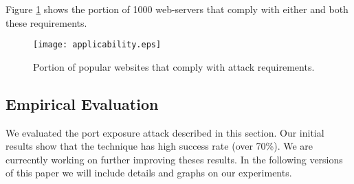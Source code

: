 \documentclass[conference]{IEEEtran}
\newcommand{\ignore}[1]{}
\begin{document}
Figure \ref{fig:sitesupport} shows the portion of 1000 web-servers that comply with either and both these requirements.

\begin{figure}
  \begin{center}
    \texttt{[image: applicability.eps]}
  \end{center}
  \caption{Portion of popular websites that comply with attack requirements.}
    \label{fig:sitesupport}
\end{figure}


\ignore{
The third requirement, is that the spoofed probe packets arrive at the client. We assume that \mal\ is capable of spoofing, and hence, that there is no spoofed packet filtering at the attacker's end. However, this attack requires that such filtering is not performed at the client's end. In particular, we require that if a firewall that filters packets by sequence number is deployed
Firewall allowing sequence numbers...
}

\subsection{Empirical Evaluation}
We evaluated the port exposure attack described in this section. Our initial results show that the technique has high success rate (over 70\%). We are currecntly working on further improving theses results. In the following versions of this paper we will include details and graphs on our experiments.
\end{document}
